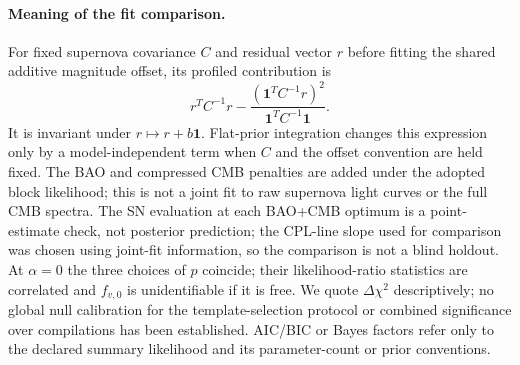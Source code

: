 \documentclass[11pt,a4paper]{article}
\begin{document}
\paragraph{Meaning of the fit comparison.}
For fixed supernova covariance $C$ and residual vector $r$ before fitting
the shared additive magnitude offset, its profiled contribution is
\[
 r^{T}C^{-1}r-
 \frac{(\mathbf 1^{T}C^{-1}r)^2}{\mathbf 1^{T}C^{-1}\mathbf 1}.
\]
It is invariant under $r\mapsto r+b\mathbf 1$. Flat-prior integration
changes this expression only by a model-independent term when $C$ and the
offset convention are held fixed. The BAO and compressed CMB penalties
are added under the adopted block likelihood; this is not a joint fit to
raw supernova light curves or the full CMB spectra. The SN evaluation at
each BAO+CMB optimum is a point-estimate check, not posterior prediction;
the CPL-line slope used for comparison was chosen using joint-fit
information, so the comparison is not a blind holdout. At $\alpha=0$
the three choices of $p$ coincide; their likelihood-ratio statistics
are correlated and $f_{v,0}$ is unidentifiable if it is free.
We quote $\Delta\chi^2$ descriptively; no global null calibration for the
template-selection protocol or combined significance over compilations
has been established. AIC/BIC or Bayes factors refer only to the declared
summary likelihood and its parameter-count or prior conventions.
\end{document}
